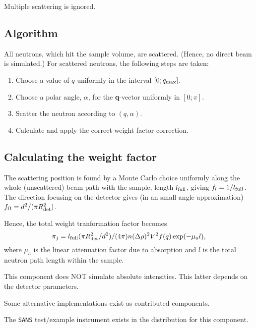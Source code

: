 Multiple scattering is ignored.

\subsection{Algorithm}
All neutrons, which hit the sample volume, are scattered.
(Hence, no direct beam is simulated.)
For scattered neutrons, the following steps are taken:
\begin{enumerate}
\item Choose a value of $q$ uniformly in the interval $[0;q_{\rm max}]$.
\item Choose a polar angle, $\alpha$,
  for the {\bf q}-vector uniformly in $[0;\pi]$.
\item Scatter the neutron according to $(q,\alpha)$.
\item Calculate and apply the correct weight factor correction.
\end{enumerate}

\subsection{Calculating the weight factor}
The scattering position is found by a Monte Carlo choice uniformly
along the whole (unscattered) beam path with the sample, length $l_{\rm full}$, giving
$f_l = 1/l_{\rm full}$. The direction focusing on the detector gives
(in an small angle approximation) $f_\Omega = d^2 / (\pi R_{\rm det}^2)$.

Hence, the total weight tranformation factor becomes %
\begin{equation}
\pi_j = l_{\rm full} (\pi R_{\rm det}^2 / d^2)/(4 \pi)
  n (\Delta\rho)^2 V^2 f(q) \exp(-\mu_a l) ,
\end{equation}
where $\mu_a$ is the linear attenuation factor due to absorption
and $l$ is the total neutron path length within the sample.

This component does NOT simulate absolute intensities. This latter depends on the detector parameters. 

Some alternative implementations exist as contributed components.

The \verb+SANS+ test/example instrument exists in the distribution for this component.
